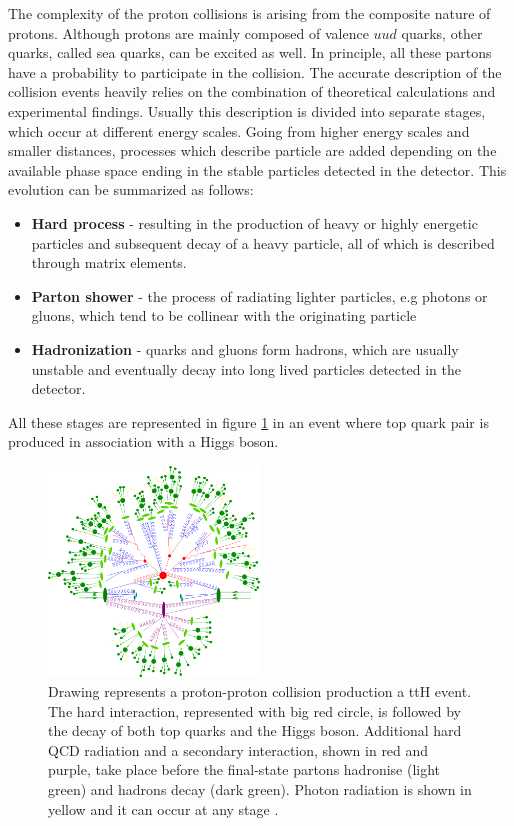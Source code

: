 The complexity of the proton collisions is arising from the composite nature of protons. Although protons are mainly composed of valence $uud$ quarks, other quarks, called sea quarks, can be excited as well. In principle, all these partons have a probability to participate in the collision.  The accurate description of the collision events heavily relies on the combination of theoretical calculations and experimental findings.  Usually this description is divided into separate stages, which occur at different energy scales. Going from higher energy scales and smaller distances, processes which describe particle are added depending on the available phase space ending in the stable particles detected in the detector. This evolution can be summarized as follows:
\begin{itemize}
\item \textbf{Hard process} - resulting in the production of heavy or highly energetic particles and subsequent decay of a heavy particle, all of which is described through matrix elements.
\item \textbf{Parton shower} - the process of radiating lighter particles, e.g photons or gluons, which tend to be collinear with the originating particle
\item \textbf{Hadronization} - quarks and gluons form hadrons, which are usually unstable and eventually decay into long lived particles detected in the detector. 
\end{itemize}

All these stages are represented in figure \ref{fig:collision} in an event where top quark pair is produced in association with a Higgs boson. 

\begin{figure}[htbp]
	\centering
		\includegraphics[width=0.5\textwidth]{Figures/collision.png}
	\caption[A drawing of a proton-proton collision with its decay products.]{Drawing represents a proton-proton collision production a ttH event. The hard interaction, represented with big red circle, is followed by the decay of both top quarks and the Higgs boson. Additional hard QCD radiation and a secondary interaction, shown in red and purple, take place before the final-state partons hadronise (light green) and hadrons decay (dark green). Photon radiation is shown in yellow and it can occur at any stage \cite{Gleisberg:2008ta}. }
	\label{fig:collision}
\end{figure}


